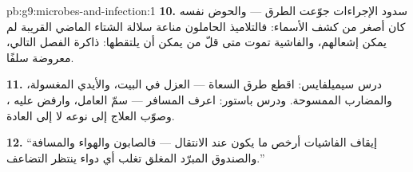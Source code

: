 \begin{solution}{pb:g9:microbes-and-infection:1}
\textbf{10.} سدود الإجراءات جوّعت الطرق --- والحوض نفسه
كان أصغر من كشف الأسماء: فالتلاميذ الحاملون مناعة سلالة
الشتاء الماضي القريبة لم يمكن إشعالهم، والفاشية تموت
متى قلّ من يمكن أن يلتقطها: ذاكرة الفصل التالي، معروضة
سلفًا.

\textbf{11.} درس سيميلفايس: اقطع طرق السعاة --- العزل في
البيت، والأيدي المغسولة، والمضارب الممسوحة. ودرس
باستور: اعرف المسافر --- سمّ العامل، وارفض عليه ،
وصوّب العلاج إلى نوعه لا إلى العادة.

\textbf{12.} ``إيقاف الفاشيات أرخص ما يكون عند الانتقال
--- فالصابون والهواء والمسافة والصندوق المبرّد المغلق
تغلب أي دواء ينتظر التضاعف.''
\end{solution}
